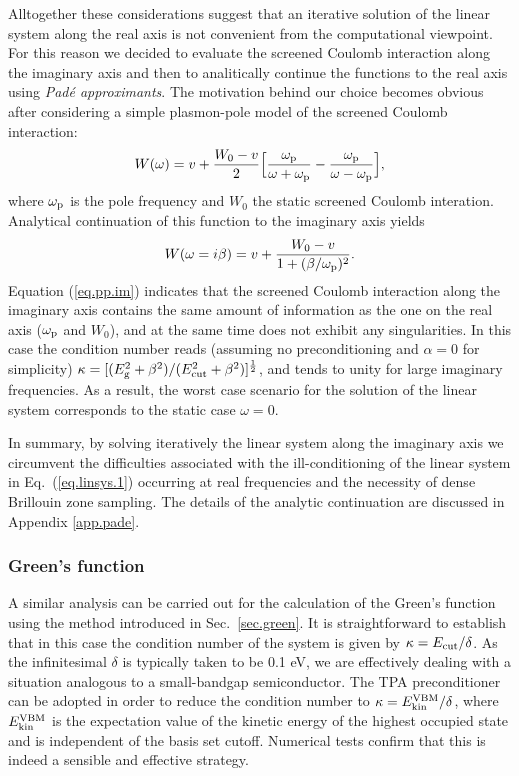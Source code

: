 \documentclass[twocolumn,prb,showpacs,superscriptaddress]{revtex4}
\def\w{\omega}
\begin{document}
Alltogether these considerations suggest that an iterative solution of the
linear system along the real axis is not convenient from the computational
viewpoint. For this reason we decided to evaluate the screened Coulomb interaction 
along the imaginary axis and then to analitically continue the functions
to the real axis using {\it Pad\'e approximants}.\cite{pade1,pade2,blochl}
The motivation behind our choice becomes obvious after considering a simple
plasmon-pole model of the screened Coulomb interaction:\cite{hl86}
  \begin{equation}
  W(\w) = v + \frac{W_0 -v}{2} \Big[ \frac{\w_{\rm p}}{\w+\w_{\rm p}} - \frac{\w_{\rm p}}{\w-\w_{\rm p}} \Big],
  \end{equation}
where $\w_{\rm p}$ is the pole frequency and $W_0$ the static screened Coulomb interation.
Analytical continuation of this function to the imaginary axis yields
  \begin{equation} \label{eq.pp.im}
  W(\w=i\beta) = v + \frac{W_0 -v}{1+(\beta/\w_{\rm p})^2}.
  \end{equation}
Equation (\ref{eq.pp.im}) indicates that the screened Coulomb interaction along the imaginary axis contains the same
amount of information as the one on the real axis ($\w_{\rm p}$ and $W_0$), and at the same time
does not exhibit any singularities. In this case the condition number reads
(assuming no preconditioning and $\alpha=0$ for simplicity) 
$\kappa=[(E_{\rm g}^2+\beta^2)/(E_{\rm cut}^2+\beta^2)]^\frac{1}{2}$,
and tends to unity for large imaginary frequencies.
As a result, the worst case scenario for the solution 
of the linear system corresponds to the static case $\w=0$.

In summary, by solving iteratively the linear system along the imaginary
axis we circumvent the difficulties associated with the ill-conditioning
of the linear system in Eq.\ (\ref{eq.linsys.1}) occurring at real frequencies
and the necessity of dense Brillouin zone sampling.
The details of the analytic continuation are discussed in Appendix \ref{app.pade}.

\subsubsection{Green's function}

A similar analysis can be carried out for the calculation of the Green's
function using the method introduced in Sec.\ \ref{sec.green}.
It is straightforward to establish that in this case the condition number
of the system is given by $\kappa = E_{\rm cut}/\delta$.
As the infinitesimal $\delta$ is typically taken to be 0.1 eV, we are effectively
dealing with a situation analogous to a small-bandgap semiconductor.
The TPA preconditioner can be adopted in order to reduce the condition number
to $\kappa = E_{\rm kin}^{\rm VBM}/\delta$, where $E_{\rm kin}^{\rm VBM}$
is the expectation value of the kinetic energy of the highest occupied state
and is independent of the basis set cutoff. Numerical tests confirm that this 
is indeed a sensible and effective strategy.
\end{document}

